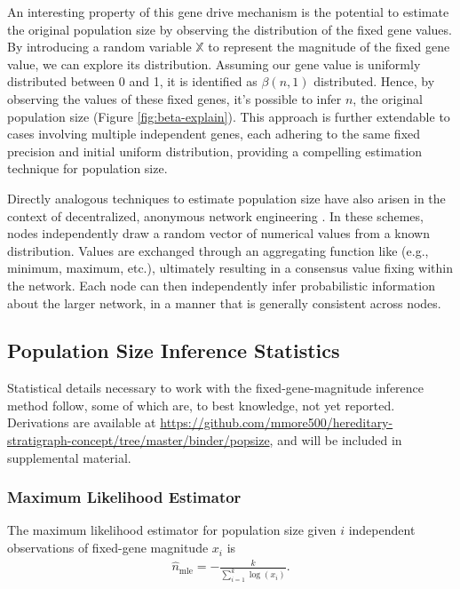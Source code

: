 

An interesting property of this gene drive mechanism is the potential to estimate the original population size by observing the distribution of the fixed gene values.
By introducing a random variable $\mathbb{X}$ to represent the magnitude of the fixed gene value, we can explore its distribution.
Assuming our gene value is uniformly distributed between 0 and 1, it is identified as $\beta(n, 1)$ \citep{gentle2009computational} distributed.
Hence, by observing the values of these fixed genes, it's possible to infer $n$, the original population size (Figure \ref{fig:beta-explain}).
This approach is further extendable to cases involving multiple independent genes, each adhering to the same fixed precision and initial uniform distribution, providing a compelling estimation technique for population size.

Directly analogous techniques to estimate population size have also arisen in the context of decentralized, anonymous network engineering \citep{varagnolo2010distributed,hakan2012distributed}.
In these schemes, nodes independently draw a random vector of numerical values from a known distribution.
Values are exchanged through an aggregating function like (e.g., minimum, maximum, etc.), ultimately resulting in a consensus value fixing within the network.
Each node can then independently infer probabilistic information about the larger network, in a manner that is generally consistent across nodes.

\subsection{Population Size Inference Statistics}
\label{sec:population-size-inference-stats}

Statistical details necessary to work with the fixed-gene-magnitude inference method follow, some of which are, to best knowledge, not yet reported.
Derivations are available at \url{https://github.com/mmore500/hereditary-stratigraph-concept/tree/master/binder/popsize}, and will be included in supplemental material.

\subsubsection{Maximum Likelihood Estimator}

The maximum likelihood estimator for population size given $i$ independent observations of fixed-gene magnitude $x_i$ is
\begin{align} \label{eqn:popsize_mle}
\hat{n}_\mathrm{mle} = -\frac{k}{\sum_{i=1}^k \log( x_i )}.
\end{align}

